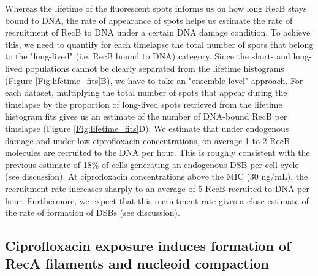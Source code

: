Whereas the lifetime of the fluorescent spots informs us on how long RecB stays bound to DNA, the rate of appearance of spots helps us estimate the rate of recruitment of RecB to DNA under a certain DNA damage condition. To achieve this, we need to quantify for each timelapse the total number of spots that belong to the "long-lived" (i.e. RecB bound to DNA) category. Since the short- and long-lived populations cannot be clearly separated from the lifetime histograms (Figure \ref{Fig:lifetime_fits}B), we have to take an "ensemble-level" approach. For each dataset, multiplying the total number of spots that appear during the timelapse by the proportion of long-lived spots retrieved from the lifetime histogram fits gives us an estimate of the number of DNA-bound RecB per timelapse (Figure \ref{Fig:lifetime_fits}D). We estimate that under endogenous damage and under low ciprofloxacin concentrations, on average 1 to 2 RecB molecules are recruited to the DNA per hour. This is roughly consistent with the previous estimate of 18\% of cells generating an endogenous DSB per cell cycle\cite{Sinha2018} (see discussion). At ciprofloxacin concentrations above the MIC (30 ng/mL), the recruitment rate increases sharply to an average of 5 RecB recruited to DNA per hour. Furthermore, we expect that this recruitment rate gives a close estimate of the rate of formation of DSBs (see discussion).

\subsection*{Ciprofloxacin exposure induces formation of RecA filaments and nucleoid compaction}

